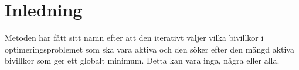 \section{Inledning}
Metoden har fått sitt namn efter att den iterativt väljer vilka bivillkor i optimeringsproblemet som ska vara aktiva och den söker efter den mängd aktiva bivillkor som ger ett globalt minimum. Detta kan vara inga, några eller alla. 